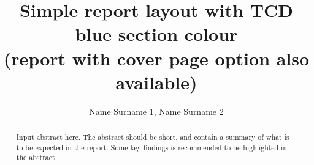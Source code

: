 \documentclass[a4paper]{article}
\begin{document}
\title{Simple report layout with TCD blue section colour \\ (report with cover page option also available)}
\author{Name Surname 1, Name Surname 2}
\maketitle

\begin{abstract}
    Input abstract here. The abstract should be short, and contain a summary of what is to be expected in the report. Some key findings is recommended to be highlighted in the abstract.
\end{abstract}




\end{document}
